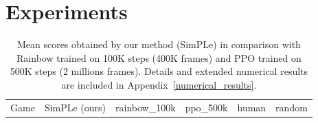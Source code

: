\section{Experiments}
\label{sec:experiments}
\label{sec:analysis}

\iffalse
\setlength{\tabcolsep}{3pt}
\begin{table}
\scriptsize
\caption{Mean scores obtained by our method (SimPLe) in comparison with Rainbow trained on 100K steps (400K frames) and PPO trained on 500K steps (2 millions frames). Details and extended numerical results are included in Appendix~\ref{numerical_results}.}
\begin{tabular}{lrrrrr}

Game &          SimPLe (ours)  &     rainbow\_100k &     ppo\_500k   &     human &          random \\


\end{tabular}
\end{table}
